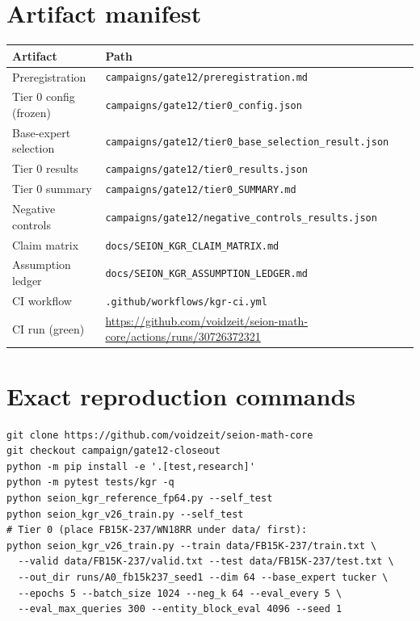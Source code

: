 \documentclass[11pt]{article}
\begin{document}
\section{Artifact manifest}
\begin{center}
\small
\begin{tabular}{@{}p{}p{}@{}}
\toprule
Artifact & Path \\
\midrule
Preregistration & \texttt{campaigns/gate12/preregistration.md} \\
Tier 0 config (frozen) & \texttt{campaigns/gate12/tier0\_config.json} \\
Base-expert selection & \texttt{campaigns/gate12/tier0\_base\_selection\_result.json} \\
Tier 0 results & \texttt{campaigns/gate12/tier0\_results.json} \\
Tier 0 summary & \texttt{campaigns/gate12/tier0\_SUMMARY.md} \\
Negative controls & \texttt{campaigns/gate12/negative\_controls\_results.json} \\
Claim matrix & \texttt{docs/SEION\_KGR\_CLAIM\_MATRIX.md} \\
Assumption ledger & \texttt{docs/SEION\_KGR\_ASSUMPTION\_LEDGER.md} \\
CI workflow & \texttt{.github/workflows/kgr-ci.yml} \\
CI run (green) & \url{https://github.com/voidzeit/seion-math-core/actions/runs/30726372321} \\
\bottomrule
\end{tabular}
\end{center}

\section{Exact reproduction commands}
\begin{lstlisting}[basicstyle=\ttfamily\small]
git clone https://github.com/voidzeit/seion-math-core
git checkout campaign/gate12-closeout
python -m pip install -e '.[test,research]'
python -m pytest tests/kgr -q
python seion_kgr_reference_fp64.py --self_test
python seion_kgr_v26_train.py --self_test
# Tier 0 (place FB15K-237/WN18RR under data/ first):
python seion_kgr_v26_train.py --train data/FB15K-237/train.txt \
  --valid data/FB15K-237/valid.txt --test data/FB15K-237/test.txt \
  --out_dir runs/A0_fb15k237_seed1 --dim 64 --base_expert tucker \
  --epochs 5 --batch_size 1024 --neg_k 64 --eval_every 5 \
  --eval_max_queries 300 --entity_block_eval 4096 --seed 1
\end{lstlisting}
\end{document}
